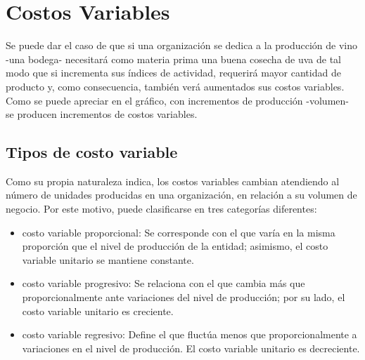 \documentclass[../main.tex]{subfiles}
\begin{document}
\chapter{Costos Variables}
Se puede dar el caso de que si una organización se dedica a la
producción de vino -una bodega- necesitará como materia prima una
buena cosecha de uva de tal modo que si incrementa sus índices de
actividad, requerirá mayor cantidad de producto y, como consecuencia,
también verá aumentados sus costos variables. Como se puede apreciar
en el gráfico, con incrementos de producción -volumen- se producen
incrementos de costos variables.
\section{Tipos de costo variable}
Como su propia naturaleza indica, los costos variables cambian
atendiendo al número de unidades producidas en una organización, en
relación a su volumen de negocio. Por este motivo, puede clasificarse
en tres categorías diferentes:
\begin{itemize}
  \item costo variable proporcional: Se corresponde con el que varía
    en la misma proporción que el nivel de producción de la entidad;
    asimismo, el costo variable unitario se mantiene constante.

  \item costo variable progresivo: Se relaciona con el que cambia más
    que proporcionalmente ante variaciones del nivel de producción;
    por su lado, el costo variable unitario es creciente.

  \item  costo variable regresivo: Define el que fluctúa menos que
    proporcionalmente a variaciones en el nivel de producción. El
    costo variable unitario es decreciente.
\end{itemize}
\end{document}
